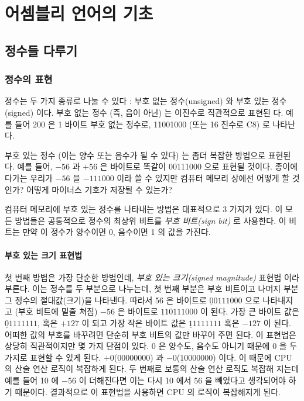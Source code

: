 ﻿
\chapter{어셈블리 언어의 기초}

\section{정수들 다루기 }

\subsection{정수의 표현 }

정수는 두 가지 종류로 나눌 수 있다 : 부호 없는 정수(unsigned) 와 부호 있는 정수(signed) 이다. 부호 없는 정수 (즉, 음이 아닌) 는 이진수로 직관적으로 표현된
다. 예를 들어 200 은 1 바이트 부호 없는 정수로, 11001000 (또는 16 진수로 C8) 로 나타난다. 


부호 있는 정수 (이는 양수 또는 음수가 될 수 있다) 는 좀더 복잡한 방법으로 표현된다. 예를 들어, $-56$ 과 $+56$ 은 바이트로 똑같이 00111000 으로 표현될 
것이다. 종이에다가는 우리가 $-56$ 을 $-111000$ 이라 쓸 수 있지만 컴퓨터 메모리 상에선 어떻게 할 것인가? 어떻게 마이너스 기호가 저장될 수 있는가?

컴퓨터 메모리에 부호 있는 정수를 나타내는 방법은 대표적으로 3 가지가 있다. 이 모든 방법들은 공통적으로 정수의 최상위 비트를 \emph{부호 비트(sign bit)}
 로 사용한다. 이 비트는 만약 이 정수가 양수이면 0, 음수이면 1 의 값을 가진다. 

\subsubsection{부호 있는 크기 표현법 }

첫 번째 방법은 가장 단순한 방법인데, \emph{부호 있는 크기(signed magnitude)} 표현법 이라 부른다. 이는 정수를 두 부분으로 나누는데, 첫 번째 부분은 부호 비트이고
나머지 부분 그 정수의 절대값(크기)을 나타낸다. 따라서 56 은 바이트로 $\underline{0}0111000$ 으로 나타내지고 (부호 비트에 밑줄 쳐짐) $-56$ 은 바이트로 
$\underline{1}10111000$ 이 된다. 가장 큰 바이트 값은 $\underline{0}1111111$, 혹은 $+127$ 이 되고 가장 작은 바이트 값은 $\underline{1}1111111$ 혹은 $-127$
이 된다. 어떠한 값의 부호를 바꾸려면 단순히 부호 비트의 값만 바꾸어 주면 된다. 이 표현법은 상당히 직관적이지만 몇 가지 단점이 있다. 0 은 양수도, 음수도 아니기
때문에 0 을 두 가지로 표현할 수 있게 된다. $+0$($\underline{0}0000000$) 과 $-0$($\underline{1}0000000$) 이다. 이 때문에 CPU 의 산술 연산 로직이 복잡하게 된다.
두 번째로 보통의 산술 연산 로직도 복잡해 지는데 예를 들어 10 에 $-56$ 이 더해진다면 이는 다시 10 에서 56 을 빼었다고 생각되어야 하기 때문이다. 
결과적으로 이 표현법을 사용하면 CPU 의 로직이 복잡해지게 된다.

